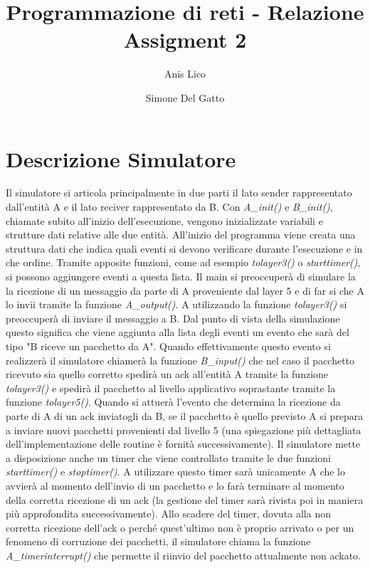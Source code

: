 \documentclass[a4paper]{article}
\author{Anis Lico \and Simone Del Gatto}
\title{Programmazione di reti - Relazione Assigment 2}
\begin{document}
\maketitle

\tableofcontents

\section{Descrizione Simulatore}
Il simulatore si articola principalmente in due parti il lato sender rappresentato dall'entità A  e il lato reciver rappresentato da B.
Con \emph{A\_init()} e \emph{B\_init()}, chiamate subito all'inizio dell'esecuzione, vengono inizializzate variabili e strutture dati relative alle due entità.
All'inizio del programma viene creata una struttura dati che indica quali eventi si devono verificare durante l'esecuzione e in che ordine. Tramite apposite funzioni, come ad esempio \emph{tolayer3()} o \emph{starttimer()}, si possono aggiungere eventi a questa lista. 
Il main si preoccuperà di simulare la la ricezione di un messaggio da parte di A proveniente dal layer 5 e di far si che A lo invii tramite la funzione \emph{A\_output()}. A utilizzando la funzione \emph{tolayer3()} si preoccuperà di inviare il messaggio a B. Dal punto di vista della simulazione questo significa che viene aggiunta alla lista degli eventi un evento che sarà del tipo "B riceve un pacchetto da A". Quando effettivamente questo evento si realizzerà il simulatore chiamerà la funzione \emph{B\_input()} che nel caso il pacchetto ricevuto sia quello corretto spedirà un ack all'entità A tramite la funzione \emph{tolayer3()} e spedirà il pacchetto al livello applicativo soprastante tramite la funzione \emph{tolayer5()}. Quando si attuerà l'evento che determina la ricezione da parte di A di un ack inviatogli da B, se il pacchetto è quello previsto A si prepara a inviare nuovi pacchetti provenienti dal livello 5 (una spiegazione più dettagliata dell'implementazione delle routine è fornità successivamente).
Il simulatore mette a disposizione anche un timer che viene controllato tramite le due funzioni \emph{starttimer()} e \emph{stoptimer()}. A utilizzare questo timer sarà unicamente A che lo avvierà al momento dell'invio di un pacchetto e lo farà terminare al momento della corretta ricezione di un ack (la gestione del timer sarà rivista poi in maniera più approfondita successivamente). Allo scadere del timer, dovuta alla non corretta ricezione dell'ack o perché quest'ultimo non è proprio arrivato o per un fenomeno di corruzione dei pacchetti, il simulatore chiama la funzione \emph{A\_timerinterrupt()} che permette il riinvio del pacchetto attualmente non ackato.
\end{document}
